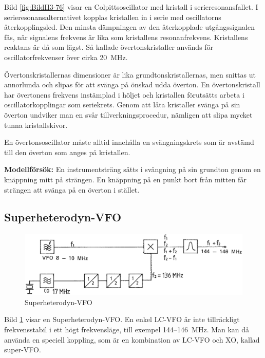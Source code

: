 Bild \ref{fig:BildII3-76} visar en Colpittsoscillator med kristall i
serieresonansfallet.
I serieresonansalternativet kopplas kristallen in i serie med
oscillatorns återkopplingsled.
Den minsta dämpningen av den återkopplade utgångssignalen fås, när signalens
frekvens är lika som kristallens resonanfrekvens.
Kristallens reaktans är då som lägst.
Så kallade övertonskristaller används för oscillatorfrekvenser över cirka 20~MHz.

Övertonskristallernas dimensioner är lika grundtonskristallernas, men
snittas ut annorlunda och slipas för att svänga på önskad udda överton.
En övertonskristall har övertonens frekvens instämplad i höljet och kristallen
förutsätts arbeta i oscillatorkopplingar som seriekrets.
Genom att låta kristaller svänga på sin överton undviker man en svår
tillverkningsprocedur, nämligen att slipa mycket tunna kristallskivor.

En övertonsoscillator måste alltid innehålla en svängningskrets som är
avstämd till den överton som anges på kristallen.

\textbf{Modellförsök:}
En instrumentsträng sätts i svängning på sin grundton genom en knäppning mitt
på strängen.
En knäppning på en punkt bort från mitten får strängen att svänga på en överton
i stället.

\subsection{Superheterodyn-VFO}

\begin{figure}
\includegraphics[width=\textwidth]{images/cropped_pdfs/bild_2_3-77.pdf}
\caption{Superheterodyn-VFO}
\label{fig:BildII3-77}
\end{figure}

Bild \ref{fig:BildII3-77} visar en Superheterodyn-VFO.
En enkel LC-VFO är inte tillräckligt frekvensstabil i ett högt frekvensläge,
till exempel 144--146~MHz.
Man kan då använda en speciell koppling, som är en kombination av LC-VFO och
XO, kallad super-VFO.

